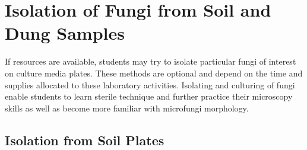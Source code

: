 \documentclass[]{book}
\begin{document}
\hypertarget{isolation-of-fungi-from-soil-and-dung-samples}{%
\section{Isolation of Fungi from Soil and Dung Samples}\label{isolation-of-fungi-from-soil-and-dung-samples}}

If resources are available, students may try to isolate particular fungi of interest on culture media plates. These methods are optional and depend on the time and supplies allocated to these laboratory activities. Isolating and culturing of fungi enable students to learn sterile technique and further practice their microscopy skills as well as become more familiar with microfungi morphology.

\hypertarget{isolation-from-soil-plates}{%
\subsection{Isolation from Soil Plates}\label{isolation-from-soil-plates}}
\end{document}
